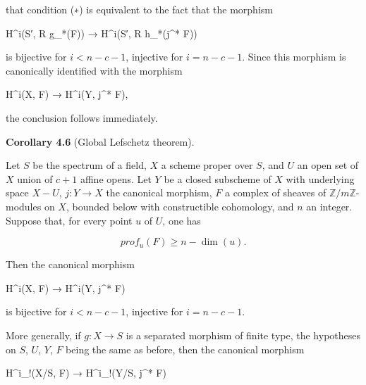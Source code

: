 \documentclass[
]{article}
\newenvironment{Shaded}{}{}
\newcommand{\NormalTok}[1]{#1}
\begin{document}
that condition (∗) is equivalent to the fact that the morphism

\begin{Shaded}
\begin{Highlighting}[]
\NormalTok{H\^{}i(S′, R g\_*(F)) → H\^{}i(S′, R h\_*(j\^{}* F))}
\end{Highlighting}
\end{Shaded}

is bijective for \(i < n - c - 1\), injective for \(i = n - c - 1\).
Since this morphism is canonically identified with the morphism

\begin{Shaded}
\begin{Highlighting}[]
\NormalTok{H\^{}i(X, F) → H\^{}i(Y, j\^{}* F),}
\end{Highlighting}
\end{Shaded}

the conclusion follows immediately.

\textbf{Corollary 4.6} (Global Lefschetz theorem).

Let \(S\) be the spectrum of a field, \(X\) a scheme proper over \(S\),
and \(U\) an open set of \(X\) union of \(c + 1\) affine opens. Let
\(Y\) be a closed subscheme of \(X\) with underlying space \(X - U\),
\(j : Y \to X\) the canonical morphism, \(F\) a complex of sheaves of
\(\mathbb{Z}/m\mathbb{Z}\)-modules on \(X\), bounded below with
constructible cohomology, and \(n\) an integer. Suppose that, for every
point \(u\) of \(U\), one has

\[
prof_{u}(F) \geqslant n - \dim({u}).
\]

Then the canonical morphism

\begin{Shaded}
\begin{Highlighting}[]
\NormalTok{H\^{}i(X, F) → H\^{}i(Y, j\^{}* F)}
\end{Highlighting}
\end{Shaded}

is bijective for \(i < n - c - 1\), injective for \(i = n - c - 1\).

More generally, if \(g : X \to S\) is a separated morphism of finite
type, the hypotheses on \(S\), \(U\), \(Y\), \(F\) being the same as
before, then the canonical morphism

\begin{Shaded}
\begin{Highlighting}[]
\NormalTok{H\^{}i\_!(X/S, F) → H\^{}i\_!(Y/S, j\^{}* F)}
\end{Highlighting}
\end{Shaded}
\end{document}
